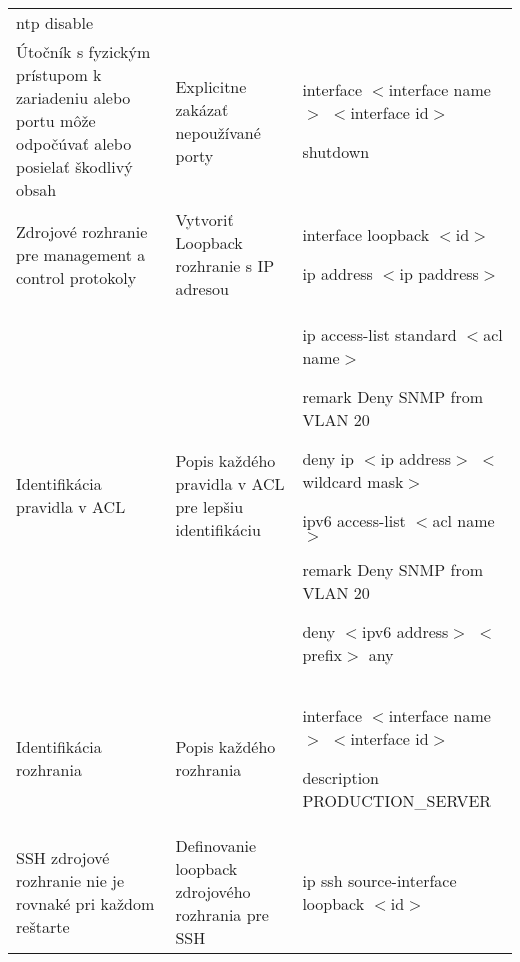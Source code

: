 \begin{longtable}[!htbp]{|L{10em}L{10em}>{\selectfont}L{34em}|}
	\hspace{0.5em}ntp disable\\
	
	
	
	
	 Útočník s fyzickým prístupom k zariadeniu alebo portu môže odpočúvať alebo posielať škodlivý obsah	&Explicitne zakázať nepoužívané porty	&interface $<$interface name$>$ $<$interface id$>$
	
	\hspace{0.5em}shutdown\\
	
	
	
	
	Zdrojové rozhranie pre management a control protokoly	&Vytvoriť Loopback rozhranie s IP adresou	&interface loopback $<$id$>$
	
	\hspace{0.5em}ip address $<$ip paddress$>$\\
	
	
	
	
	 Identifikácia pravidla v ACL	&Popis každého pravidla v ACL pre lepšiu identifikáciu	&ip access-list standard $<$acl name$>$
	
	\hspace{0.5em}remark Deny SNMP from VLAN 20
	
	\hspace{0.5em}deny ip $<$ip address$>$ $<$wildcard mask$>$
	\vspace{0.5em}
	
	ipv6 access-list $<$acl name$>$
	
	\hspace{0.5em}remark Deny SNMP from VLAN 20
	
	\hspace{0.5em}deny $<$ipv6 address$>$ $<$prefix$>$ any\\
	
	
	
	
	Identifikácia rozhrania	&Popis každého rozhrania	&interface $<$interface name$>$ $<$interface id$>$
	
	\hspace{0.5em}description PRODUCTION\_SERVER\\
	
	
	
	
	SSH zdrojové rozhranie nie je rovnaké pri každom reštarte	& Definovanie loopback zdrojového rozhrania pre SSH	&ip ssh source-interface loopback $<$id$>$\\
	

\end{longtable}
